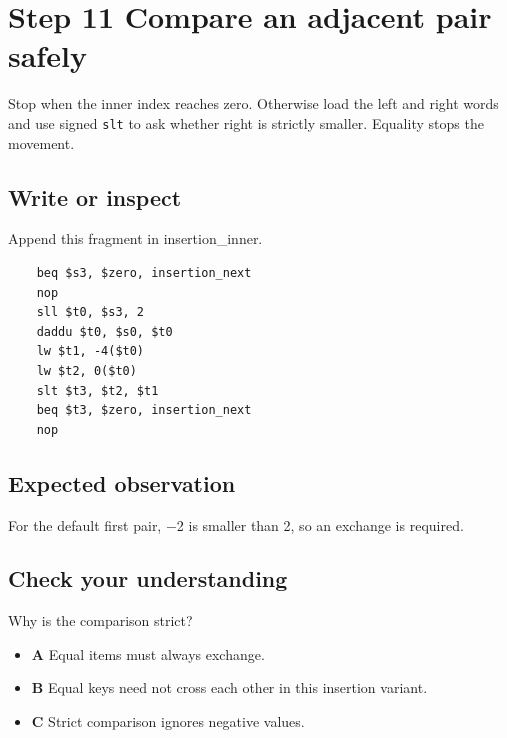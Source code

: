 \section{Step 11 Compare an adjacent pair
  safely}\label{009-sorting-visualizer-s11-step-11-compare-an-adjacent-pair-safely}

Stop when the inner index reaches zero. Otherwise load the left and
right words and use signed \texttt{slt} to ask whether right is strictly
smaller. Equality stops the movement.

\subsection{Write or
  inspect}\label{009-sorting-visualizer-s11-write-or-inspect}

Append this fragment in insertion\_inner.

\begin{verbatim}
    beq $s3, $zero, insertion_next
    nop
    sll $t0, $s3, 2
    daddu $t0, $s0, $t0
    lw $t1, -4($t0)
    lw $t2, 0($t0)
    slt $t3, $t2, $t1
    beq $t3, $zero, insertion_next
    nop
\end{verbatim}

\subsection{Expected
  observation}\label{009-sorting-visualizer-s11-expected-observation}

For the default first pair, \ensuremath{-}2 is smaller than 2, so an exchange is
required.

\subsection{Check your
  understanding}\label{009-sorting-visualizer-s11-check-your-understanding}

Why is the comparison strict?

\begin{itemize}
  \tightlist
  \item
        \textbf{A} Equal items must always exchange.
  \item
        \textbf{B} Equal keys need not cross each other in this insertion
        variant.
  \item
        \textbf{C} Strict comparison ignores negative values.
\end{itemize}
